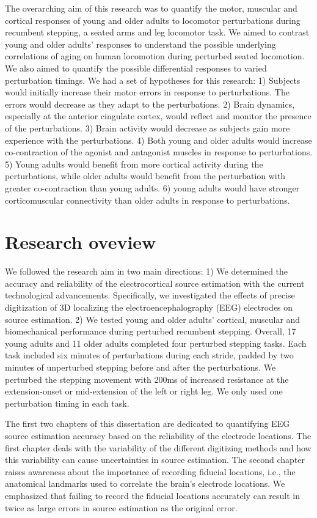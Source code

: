 \documentclass[../thesis_seyed.tex]{subfiles}
\begin{document}
The overarching aim of this research was to quantify the motor, muscular and cortical responses of young and older adults to locomotor perturbations during recumbent stepping, a seated arms and leg locomotor task. We aimed to contrast young and older adults' responses to understand the possible underlying correlations of aging on human locomotion during perturbed seated locomotion. We also aimed to quantify the possible differential responses to varied perturbation timings. We had a set of hypotheses for this research: 1) Subjects would initially increase their motor errors in response to perturbations. The errors would decrease as they adapt to the perturbations. 2) Brain dynamics, especially at the anterior cingulate cortex, would reflect and monitor the presence of the perturbations. 3) Brain activity would decrease as subjects gain more experience with the perturbations. 4) Both young and older adults would increase co-contraction of the agonist and antagonist muscles in response to perturbations. 5) Young adults would benefit from more cortical activity during the perturbations, while older adults would benefit from the perturbation with greater co-contraction than young adults. 6) young adults would have stronger corticomuscular connectivity than older adults in response to perturbations.

\section{Research oveview}
We followed the research aim in two main directions: 1) We determined the accuracy and reliability of the electrocortical source estimation with the current technological advancements. Specifically, we investigated the effects of precise digitization of 3D localizing the electroencephalography (EEG) electrodes on source estimation. 2) We tested young and older adults' cortical, muscular and biomechanical performance during perturbed recumbent stepping. Overall, 17 young adults and 11 older adults completed four perturbed stepping tasks. Each task included six minutes of perturbations during each stride, padded by two minutes of unperturbed stepping before and after the perturbations. We perturbed the stepping movement with 200ms of increased resistance at the extension-onset or mid-extension of the left or right leg. We only used one perturbation timing in each task.

The first two chapters of this dissertation are dedicated to quantifying EEG source estimation accuracy based on the reliability of the electrode locations. The first chapter deals with the variability of the different digitizing methods and how this variability can cause uncertainties in source estimation. The second chapter raises awareness about the importance of recording fiducial locations, i.e., the anatomical landmarks used to correlate the brain's electrode locations. We emphasized that failing to record the fiducial locations accurately can result in twice as large errors in source estimation as the original error.
\end{document}
